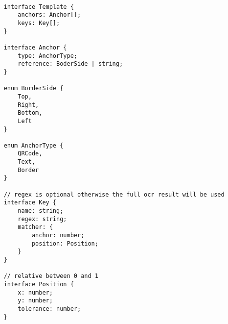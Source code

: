 \documentclass[../ockr-specification.tex]{subfiles}
\begin{document}
\begin{lstlisting}
    
    interface Template {
        anchors: Anchor[];
        keys: Key[];
    }

    interface Anchor {
        type: AnchorType;
        reference: BoderSide | string;
    }

    enum BorderSide {
        Top,
        Right,
        Bottom,
        Left
    }

    enum AnchorType {
        QRCode,
        Text,
        Border
    }

    // regex is optional otherwise the full ocr result will be used
    interface Key {
        name: string;
        regex: string;
        matcher: {
            anchor: number;
            position: Position;
        } 
    }

    // relative between 0 and 1
    interface Position {
        x: number;
        y: number;
        tolerance: number;
    }
    
\end{lstlisting}
\newpage
\end{document}
